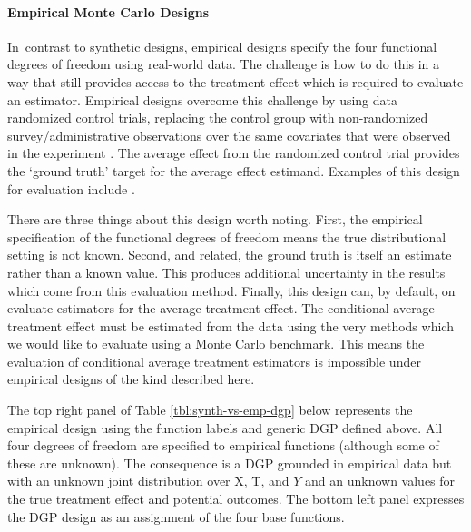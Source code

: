 \documentclass[../main.tex]{subfiles}
\begin{document}
\vspace{\baselineskip}
\paragraph*{Empirical Monte Carlo Designs}\par


\vspace{\baselineskip}
In\ contrast to synthetic designs, empirical designs specify the four functional degrees of freedom using real-world data. The challenge is how to do this in a way that still provides access to the treatment effect which is required to evaluate an estimator. Empirical designs overcome this challenge by using data randomized control trials, replacing the control group with non-randomized survey/administrative observations over the same covariates that were observed in the experiment \parencite{Huber2013TheScore}. The average effect from the randomized control trial provides the ‘ground truth’ target for the average effect estimand. Examples of this design for evaluation include \parencite{Lalonde1986EvaluatingData, Fraker1987ThePrograms, Friedlander1995EvaluatingMethods, Heckman1998MatchingEstimator, Dehejia1999CausalPrograms, Smith2005DoesEstimators, Flores2009EvaluatingData}.\par

\vspace{\baselineskip}

There are three things about this design worth noting. First, the empirical specification of the functional degrees of freedom means the true distributional setting is not known. Second, and related, the ground truth is itself an estimate rather than a known value. This produces additional uncertainty in the results which come from this evaluation method. Finally, this design can, by default, on evaluate estimators for the average treatment effect. The conditional average treatment effect must be estimated from the data using the very methods which we would like to evaluate using a Monte Carlo benchmark. This means the evaluation of conditional average treatment estimators is impossible under empirical designs of the kind described here.\par


\vspace{\baselineskip}
The top right panel of Table \ref{tbl:synth-vs-emp-dgp} below represents the empirical design using the function labels and generic DGP defined above. All four degrees of freedom are specified to empirical functions (although some of these are unknown). The consequence is a DGP grounded in empirical data but with an unknown joint distribution over  \( \text{X, T,} \) and  \( Y \) and an unknown values for the true treatment effect and potential outcomes. The bottom left panel expresses the \textcite{Lalonde1986EvaluatingData} DGP design as an assignment of the four base functions.\par
\end{document}
